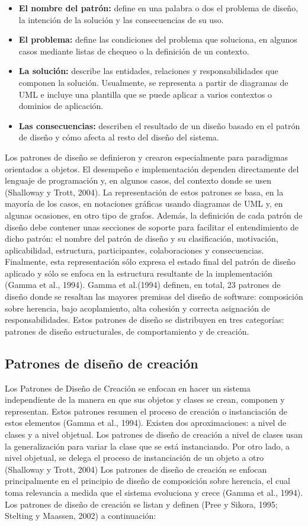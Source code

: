 \documentclass[twoside,twocolumn]{article}
\begin{document}
\begin{itemize}
	\item \textbf{El nombre del patrón:} define en una palabra o dos el problema de diseño, la intención de la solución y las consecuencias de su uso.  
	\item \textbf{El problema:} define las condiciones del problema que soluciona, en algunos casos mediante listas de chequeo o la definición de un contexto.  
	\item \textbf{La solución:} describe las entidades, relaciones y responsabilidades que componen la solución. Usualmente, se representa a partir de diagramas de UML e incluye una plantilla que se puede aplicar a varios contextos o dominios de aplicación.  
	\item \textbf{Las consecuencias:} describen el resultado de un diseño basado en el patrón de diseño y cómo afecta al resto del diseño del sistema. 
\end{itemize}
Los patrones de diseño se definieron y crearon especialmente para paradigmas orientados a objetos. El desempeño e implementación dependen directamente del lenguaje de programación y, en algunos casos, del contexto donde se usen (Shalloway y Trott, 2004).  
La representación de estos patrones se basa, en la mayoría de los casos, en notaciones gráficas usando diagramas de UML y, en algunas ocasiones, en otro tipo de grafos. Además, la definición de cada patrón de diseño debe contener unas secciones de soporte para facilitar el entendimiento de dicho patrón: el nombre del patrón de diseño y su clasificación, motivación, aplicabilidad, estructura, participantes, colaboraciones y consecuencias. Finalmente, esta representación sólo expresa el estado final del patrón de diseño aplicado y sólo se enfoca en la estructura resultante de la implementación (Gamma et al., 1994).  
Gamma et al.(1994) definen, en total, 23 patrones de diseño donde se resaltan las mayores premisas del diseño de software: composición sobre herencia, bajo acoplamiento, alta cohesión y correcta asignación de responsabilidades. Estos patrones de diseño se distribuyen en tres categorías: patrones de diseño estructurales, de comportamiento y de creación. 

\subsection{Patrones de diseño de creación}
Los Patrones de Diseño de Creación se enfocan en hacer un sistema independiente de la manera en que sus objetos y clases se crean, componen y representan. Estos patrones resumen el proceso de creación o instanciación de estos elementos (Gamma et al., 1994). Existen dos aproximaciones: a nivel de clases y a nivel objetual. Los patrones de diseño de creación a nivel de clases usan la generalización para variar la clase que se está instanciando. Por otro lado, a nivel objetual, se delega el proceso de instanciación de un objeto a otro (Shalloway y Trott, 2004) 
Los patrones de diseño de creación se enfocan principalmente en el principio de diseño de composición sobre herencia, el cual toma relevancia a medida que el sistema evoluciona y crece (Gamma et al., 1994). Los patrones de diseño de creación se listan y definen (Pree y Sikora, 1995; Stelting y Maassen, 2002) a continuación: 	
\end{document}
